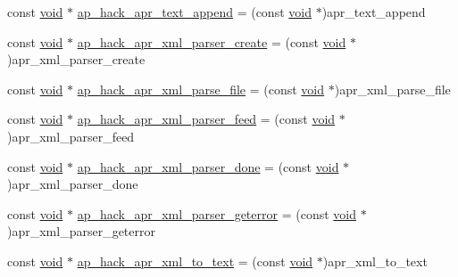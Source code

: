 \begin{DoxyCompactItemize}
const \hyperlink{group__MOD__ISAPI_gacd6cdbf73df3d9eed42fa493d9b621a6}{void} $\ast$ \hyperlink{srclib_2apr-util_2exports_8c_ac00de6935fe82862f031fe5966a0ee4e}{ap\+\_\+hack\+\_\+apr\+\_\+text\+\_\+append} = (const \hyperlink{group__MOD__ISAPI_gacd6cdbf73df3d9eed42fa493d9b621a6}{void} $\ast$)apr\+\_\+text\+\_\+append
\item 
const \hyperlink{group__MOD__ISAPI_gacd6cdbf73df3d9eed42fa493d9b621a6}{void} $\ast$ \hyperlink{srclib_2apr-util_2exports_8c_aef0d77e00a4c1f90efe214432b5ffcc7}{ap\+\_\+hack\+\_\+apr\+\_\+xml\+\_\+parser\+\_\+create} = (const \hyperlink{group__MOD__ISAPI_gacd6cdbf73df3d9eed42fa493d9b621a6}{void} $\ast$)apr\+\_\+xml\+\_\+parser\+\_\+create
\item 
const \hyperlink{group__MOD__ISAPI_gacd6cdbf73df3d9eed42fa493d9b621a6}{void} $\ast$ \hyperlink{srclib_2apr-util_2exports_8c_aa430a060a6719d997c83790a0b081f1c}{ap\+\_\+hack\+\_\+apr\+\_\+xml\+\_\+parse\+\_\+file} = (const \hyperlink{group__MOD__ISAPI_gacd6cdbf73df3d9eed42fa493d9b621a6}{void} $\ast$)apr\+\_\+xml\+\_\+parse\+\_\+file
\item 
const \hyperlink{group__MOD__ISAPI_gacd6cdbf73df3d9eed42fa493d9b621a6}{void} $\ast$ \hyperlink{srclib_2apr-util_2exports_8c_a28f0f135c17f2f09dda953106e284120}{ap\+\_\+hack\+\_\+apr\+\_\+xml\+\_\+parser\+\_\+feed} = (const \hyperlink{group__MOD__ISAPI_gacd6cdbf73df3d9eed42fa493d9b621a6}{void} $\ast$)apr\+\_\+xml\+\_\+parser\+\_\+feed
\item 
const \hyperlink{group__MOD__ISAPI_gacd6cdbf73df3d9eed42fa493d9b621a6}{void} $\ast$ \hyperlink{srclib_2apr-util_2exports_8c_a8aa8f6eaaebcb71731adfcf48a4e4089}{ap\+\_\+hack\+\_\+apr\+\_\+xml\+\_\+parser\+\_\+done} = (const \hyperlink{group__MOD__ISAPI_gacd6cdbf73df3d9eed42fa493d9b621a6}{void} $\ast$)apr\+\_\+xml\+\_\+parser\+\_\+done
\item 
const \hyperlink{group__MOD__ISAPI_gacd6cdbf73df3d9eed42fa493d9b621a6}{void} $\ast$ \hyperlink{srclib_2apr-util_2exports_8c_af5920ca79734c756f954b34849f374cf}{ap\+\_\+hack\+\_\+apr\+\_\+xml\+\_\+parser\+\_\+geterror} = (const \hyperlink{group__MOD__ISAPI_gacd6cdbf73df3d9eed42fa493d9b621a6}{void} $\ast$)apr\+\_\+xml\+\_\+parser\+\_\+geterror
\item 
const \hyperlink{group__MOD__ISAPI_gacd6cdbf73df3d9eed42fa493d9b621a6}{void} $\ast$ \hyperlink{srclib_2apr-util_2exports_8c_a3f36a9bba3e77836e7881928b7a8096d}{ap\+\_\+hack\+\_\+apr\+\_\+xml\+\_\+to\+\_\+text} = (const \hyperlink{group__MOD__ISAPI_gacd6cdbf73df3d9eed42fa493d9b621a6}{void} $\ast$)apr\+\_\+xml\+\_\+to\+\_\+text

\end{DoxyCompactItemize}
